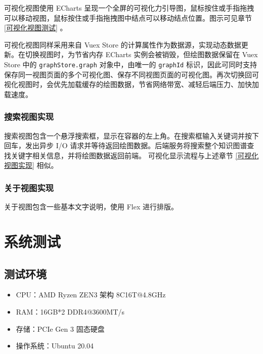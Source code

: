 \documentclass[a4paper,AutoFakeBold,oneside,12pt]{book}
\begin{document}
可视化视图使用 ECharts 呈现一个全屏的可视化力引导图，鼠标按住或手指拖拽可以移动视图，鼠标按住或手指拖拽图中结点可以移动结点位置。图示可见章节 \ref{可视化视图测试} 。

可视化视图同样采用来自 Vuex Store 的计算属性作为数据源，实现动态数据更新。在切换视图时，为节省内存 ECharts 实例会被销毁，但绘图数据保留在 Vuex Store 中的 \lstinline|graphStore.graph| 对象中，由唯一的 \lstinline|graphId| 标识，因此可同时支持保存同一视图页面的多个可视化图、保存不同视图页面的可视化图。再次切换回可视化视图时，会优先加载缓存的绘图数据，节省网络带宽、减轻后端压力、加快加载速度。

\subsection{搜索视图实现}

搜索视图包含一个悬浮搜索框，显示在容器的左上角。在搜索框输入关键词并按下回车，发出异步 I/O 请求并等待返回绘图数据。后端服务将搜索整个知识图谱查找关键字相关信息，并将绘图数据返回前端。 可视化显示流程与上述章节 \ref{可视化视图实现} 相似。



\subsection{关于视图实现}

关于视图包含一些基本文字说明，使用 Flex 进行排版。

\chapter{系统测试}

\section{测试环境}

\begin{itemize}
	\item CPU：AMD Ryzen ZEN3 架构 8C16T@4.8GHz
	\item RAM：16GB*2 DDR4@3600MT/s
	\item 存储：PCIe Gen 3 固态硬盘
	\item 操作系统：Ubuntu 20.04
\end{itemize}
\end{document}
